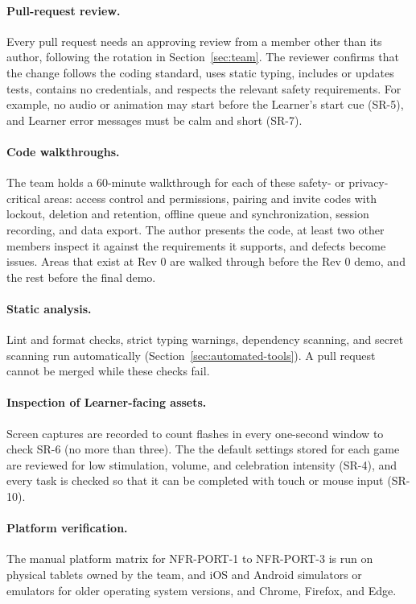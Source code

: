 \documentclass[12pt, titlepage]{article}
\newcommand{\srsref}[1]{#1}
\begin{document}
\paragraph{Pull-request review.} Every pull request needs an approving review
from a member other than its author, following the rotation in
Section~\ref{sec:team}. The reviewer confirms that the change follows the
coding standard, uses static typing, includes or updates tests, contains no
credentials, and respects the relevant safety requirements. For example, no
audio or animation may start before the Learner's start cue (\srsref{SR-5}), and Learner
error messages must be calm and short (\srsref{SR-7}).

\paragraph{Code walkthroughs.} The team holds a 60-minute walkthrough for each
of these safety- or privacy-critical areas: access control and permissions,
pairing and invite codes with lockout, deletion and retention, offline queue
and synchronization, session recording, and data export. The author presents
the code, at least two other members inspect it against the requirements it
supports, and defects become issues. Areas that exist at Rev 0 are walked
through before the Rev 0 demo, and the rest before the final demo.

\paragraph{Static analysis.} Lint and format checks, strict typing warnings,
dependency scanning, and secret scanning run automatically
(Section~\ref{sec:automated-tools}). A pull request cannot be merged while these checks
fail.

\paragraph{Inspection of Learner-facing assets.} Screen captures are recorded to count flashes in every one-second window to check
\srsref{SR-6} (no more than three). The the default settings stored for each game are reviewed for low stimulation, volume, and celebration intensity (\srsref{SR-4}), and every task is checked so that it can be completed with touch or mouse input (\srsref{SR-10}).

\paragraph{Platform verification.} The manual platform matrix for
\srsref{NFR-PORT-1} to \srsref{NFR-PORT-3} is run on physical tablets owned by the team, and iOS and Android
simulators or emulators for older operating system versions, and Chrome,
Firefox, and Edge.
\end{document}
